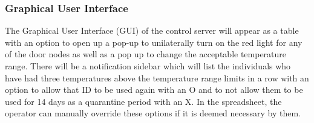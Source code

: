 \subsubsection{Graphical User Interface}
The Graphical User Interface (GUI) of the control server will appear as a table
with an option to open up a pop-up to unilaterally turn on the red light for any
of the door nodes as well as a pop up to change the acceptable temperature
range. There will be a notification sidebar which will list the individuals who
have had three temperatures above the temperature range limits in a row with an
option to allow that ID to be used again with an O and to not allow them to be
used for 14 days as a quarantine period with an X. In the spreadsheet, the
operator can manually override these options if it is deemed necessary by them.

